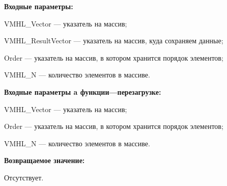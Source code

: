 \textbf{Входные параметры:}
 
VMHL\_Vector --- указатель на массив;
 
VMHL\_ResultVector --- указатель на массив, куда сохраняем данные;
 
Order --- указатель на массив, в котором хранится порядок элементов;
 
VMHL\_N --- количество элементов в массиве.
 
\textbf{Входные параметры a функции---перезагрузке:}
 
VMHL\_Vector --- указатель на массив;
 
Order --- указатель на массив, в котором хранится порядок элементов;
 
VMHL\_N --- количество элементов в массиве.

\textbf{Возвращаемое значение:}

Отсутствует.
